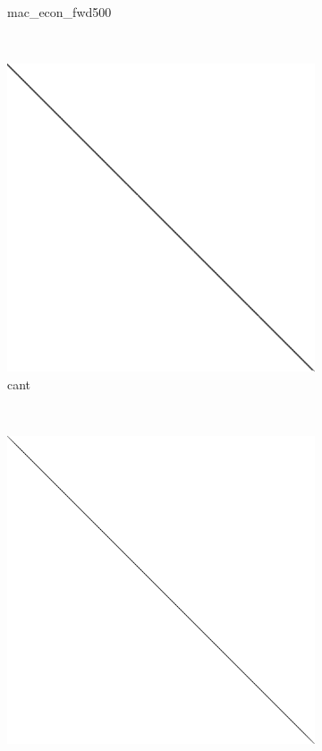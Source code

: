 \begin{figure}
\begin{multicols}{4}
\begin{subfigure}{\linewidth}
\caption{mac\_econ\_fwd500}
\end{subfigure}~%
\begin{subfigure}{\linewidth}
\includegraphics[width=\linewidth]{images/cant}
\caption{cant}
\end{subfigure}~%
\begin{subfigure}{\linewidth}
    \includegraphics[width=\linewidth]{images/mc2depi}

\end{subfigure}
\end{multicols}
\end{figure}

